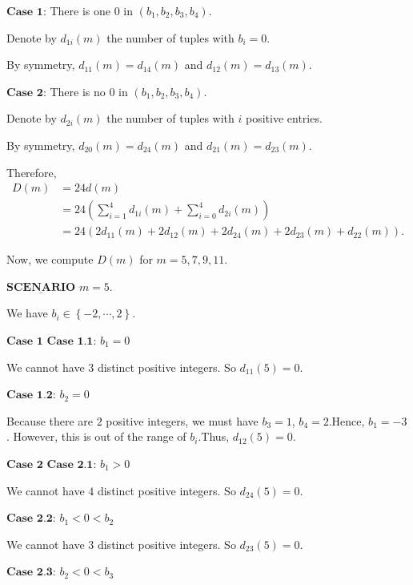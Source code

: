 \begin{enumerate}
 $\textbf{Case 1}$: There is one $0$ in $\left( b_1 , b_2 , b_3 , b_4 \right)$.

 Denote by $d_{1i} \left( m \right)$ the number of tuples with $b_i = 0$.

 By symmetry, $d_{11} \left( m \right)= d_{14} \left( m \right)$ and $d_{12} \left( m \right)= d_{13} \left( m \right)$.

 $\textbf{Case 2}$: There is no $0$ in $\left( b_1 , b_2 , b_3 , b_4 \right)$.

 Denote by $d_{2i} \left( m \right)$ the number of tuples with $i$ positive entries.

 By symmetry, $d_{20} \left( m \right) = d_{24} \left( m \right)$ and $d_{21} \left( m \right) = d_{23} \left( m \right)$.

 Therefore,
 \begin{align*} D \left( m \right) & = 24 d \left( m \right) \\ & = 24 \left( \sum_{i=1}^4 d_{1i} \left( m \right) + \sum_{i=0}^4 d_{2i} \left( m \right) \right) \\ & = 24 \left( 2 d_{11} \left( m \right) + 2 d_{12} \left( m \right) + 2 d_{24} \left( m \right) + 2 d_{23} \left( m \right) + d_{22} \left( m \right) \right) . \end{align*}


 Now, we compute $D \left( m \right)$ for $m = 5 , 7 , 9 , 11$. 

 
$\underline{\textbf{SCENARIO}}$ $m = 5$.

 We have $b_i \in \left\{ - 2 , \cdots , 2 \right\}$.

 $\textbf{Case 1}$
$\textbf{Case 1.1}$: $b_1 = 0$

 We cannot have $3$ distinct positive integers. So $d_{11} \left( 5 \right) = 0$.

 $\textbf{Case 1.2}$: $b_2 = 0$

 Because there are $2$ positive integers, we must have $b_3 = 1$, $b_4 = 2$.Hence, $b_1 = - 3$. However, this is out of the range of $b_i$.Thus, $d_{12} \left( 5 \right) = 0$.

 $\textbf{Case 2}$
$\textbf{Case 2.1}$: $b_1 > 0$

 We cannot have $4$ distinct positive integers. So $d_{24} \left( 5 \right) = 0$.

 $\textbf{Case 2.2}$: $b_1 < 0 < b_2$

 We cannot have $3$ distinct positive integers. So $d_{23} \left( 5 \right) = 0$.

 $\textbf{Case 2.3}$: $b_2 < 0 < b_3$


\end{enumerate}
